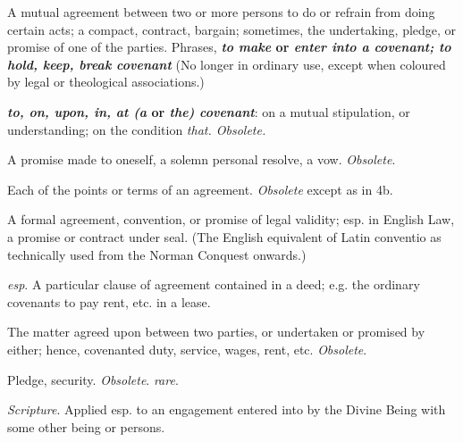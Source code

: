 		\begin{compactitem}
			\item[1a] A mutual agreement between two or more persons to do or refrain from doing certain acts; a compact, contract, bargain; sometimes, the undertaking, pledge, or promise of one of the parties. Phrases, \textbf{\textit{to make} or \textit{enter into a covenant; to hold, keep, break covenant}} (No longer in ordinary use, except when coloured by legal or theological associations.)
			\item[1b] \textbf{\textit{to, on, upon, in, at (a} or \textit{the) covenant}}: on a mutual stipulation, or understanding; on the condition \textit{that. Obsolete.}
			\item[2] A promise made to oneself, a solemn personal resolve, a vow. \textit{Obsolete}.
			\item[3] Each of the points or terms of an agreement. \textit{Obsolete} except as in 4b.
			\item[4a] A formal agreement, convention, or promise of legal validity; esp. in English Law, a promise or contract under seal. (The English equivalent of Latin conventio as technically used from the Norman Conquest onwards.)
			\item[4b] \textit{esp}. A particular clause of agreement contained in a deed; e.g. the ordinary covenants to pay rent, etc. in a lease.
			\item[5] The matter agreed upon between two parties, or undertaken or promised by either; hence, covenanted duty, service, wages, rent, etc. \textit{Obsolete}.
			\item[6] Pledge, security. \textit{Obsolete}. \textit{rare}.
			\item[7a] \textit{Scripture}. Applied esp. to an engagement entered into by the Divine Being with some other being or persons.
				\begin{compactitem}

\end{compactitem}
\end{compactitem}
